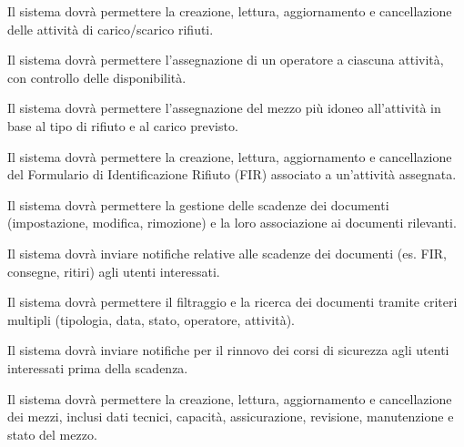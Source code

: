 \documentclass[a4paper]{report}
\begin{document}


Il sistema dovrà permettere la creazione, lettura, aggiornamento e cancellazione delle attività di carico/scarico rifiuti.


Il sistema dovrà permettere l'assegnazione di un operatore a ciascuna attività, con controllo delle disponibilità.


Il sistema dovrà permettere l'assegnazione del mezzo più idoneo all'attività in base al tipo di rifiuto e al carico previsto.



Il sistema dovrà permettere la creazione, lettura, aggiornamento e cancellazione del Formulario di Identificazione Rifiuto (FIR) associato a un'attività assegnata.


Il sistema dovrà permettere la gestione delle scadenze dei documenti (impostazione, modifica, rimozione) e la loro associazione ai documenti rilevanti.


Il sistema dovrà inviare notifiche relative alle scadenze dei documenti (es. FIR, consegne, ritiri) agli utenti interessati.


Il sistema dovrà permettere il filtraggio e la ricerca dei documenti tramite criteri multipli (tipologia, data, stato, operatore, attività).


Il sistema dovrà inviare notifiche per il rinnovo dei corsi di sicurezza agli utenti interessati prima della scadenza.



Il sistema dovrà permettere la creazione, lettura, aggiornamento e cancellazione dei mezzi, inclusi dati tecnici, capacità, assicurazione, revisione, manutenzione e stato del mezzo.
\end{document}
